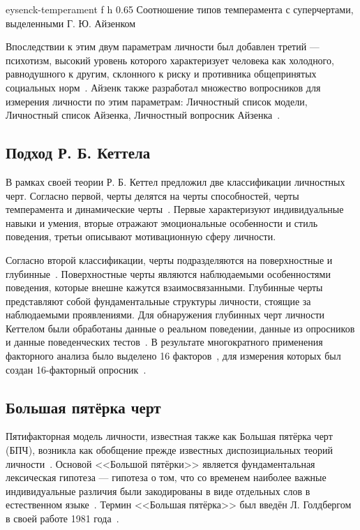 {eysenck-temperament}
{f}
{h}
{0.65\textwidth}
{Соотношение типов темперамента с суперчертами, выделенными Г. Ю. Айзенком}

Впоследствии к этим двум параметрам личности был добавлен третий --- психотизм, высокий уровень которого характеризует человека как холодного, равнодушного к другим, склонного к риску и противника общепринятых социальных норм~\cite{theory_of_personality_eysenck}.
Айзенк также разработал множество вопросников для измерения личности по этим параметрам: Личностный список модели, Личностный список Айзенка, Личностный вопросник Айзенка~\cite{PervinJohn2001Personality}.

\subsection{Подход Р. Б. Кеттела}

В рамках своей теории Р. Б. Кеттел предложил две классификации личностных черт.
Согласно первой, черты делятся на черты способностей, черты темперамента и динамические черты~\cite{PervinJohn2001Personality}.
Первые характеризуют индивидуальные навыки и умения, вторые отражают эмоциональные особенности и стиль поведения, третьи описывают мотивационную сферу личности.

Согласно второй классификации, черты подразделяются на поверхностные и глубинные~\cite{PervinJohn2001Personality}.
Поверхностные черты являются наблюдаемыми особенностями поведения, которые внешне кажутся взаимосвязанными.
Глубинные черты представляют собой фундаментальные структуры личности, стоящие за наблюдаемыми проявлениями.
Для обнаружения глубинных черт личности Кеттелом были обработаны данные о реальном поведении, данные из опросников и данные поведенческих тестов~\cite{PervinJohn2001Personality, theory_of_personality_cattell}.
В результате многократного применения факторного анализа было выделено 16 факторов~\cite{hjellegger-zigler}, для измерения которых был создан 16-факторный опросник~\cite{cattell_questionnaire}.

\subsection{Большая пятёрка черт}

Пятифакторная модель личности, известная также как Большая пятёрка черт (БПЧ), возникла как обобщение прежде известных диспозициальных теорий личности~\cite{PervinJohn2001Personality}.
Основой <<Большой пятёрки>> является фундаментальная лексическая гипотеза --- гипотеза о том, что со временем наиболее важные индивидуальные различия были закодированы в виде отдельных слов в естественном языке~\cite{big_five_traits}.
Термин <<Большая пятёрка>> был введён Л. Голдбергом в своей работе 1981 года~\cite{goldberg1981language}.

